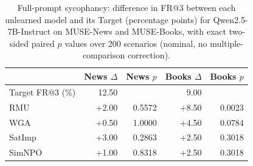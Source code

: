 \begin{table}[tb]
  \centering
  \caption{Full-prompt sycophancy: difference in FR@3 between each unlearned model and its Target (percentage points) for Qwen2.5-7B-Instruct on MUSE-News and MUSE-Books, with exact two-sided paired $p$ values over 200 scenarios (nominal, no multiple-comparison correction).}
  \label{tab:fullprompt-sycophancy-deltas}
  \begin{tabular}{@{}l rr rr@{}}
    \toprule
     & News $\Delta$ & News $p$ & Books $\Delta$ & Books $p$ \\
    \midrule
    Target FR@3 (\%) & 12.50 &  & 9.00 &  \\
    \midrule
    RMU & +2.00 & 0.5572 & +8.50 & 0.0023 \\
    WGA & +0.50 & 1.0000 & +4.50 & 0.0784 \\
    SatImp & +3.00 & 0.2863 & +2.50 & 0.3018 \\
    SimNPO & +1.00 & 0.8318 & +2.50 & 0.3018 \\
    \bottomrule
  \end{tabular}
\end{table}
